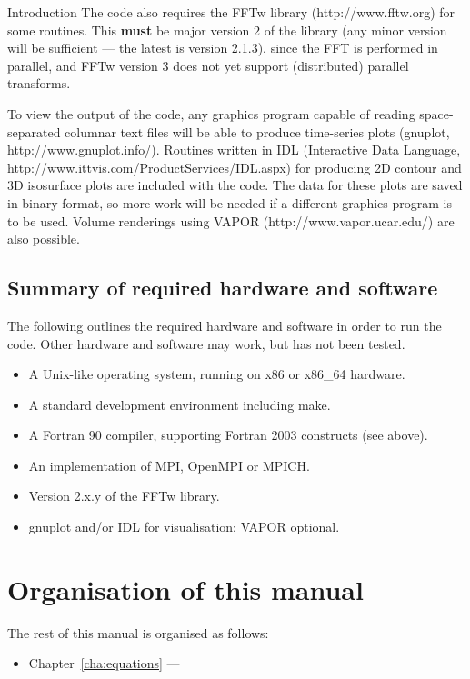 \begin{chapter}{\label{cha:introduction}Introduction}
  The code also requires the FFTw library (http://www.fftw.org) for some
  routines.  This \textbf{must} be major version 2 of the library (any minor
  version will be sufficient --- the latest is version 2.1.3), since the FFT is
  performed in parallel, and FFTw version 3 does not yet support (distributed)
  parallel transforms.

  To view the output of the code, any graphics program capable of reading
  space-separated columnar text files will be able to produce time-series plots
  (\eg gnuplot, http://www.gnuplot.info/).  Routines written in IDL
  (Interactive Data Language, http://www.ittvis.com/ProductServices/IDL.aspx)
  for producing 2D contour and 3D isosurface plots are included with the code.
  The data for these plots are saved in binary format, so more work will be
  needed if a different graphics program is to be used.  Volume renderings
  using VAPOR (http://www.vapor.ucar.edu/) are also possible.

  \subsection{Summary of required hardware and software}
  The following outlines the required hardware and software in order to run the
  code.  Other hardware and software may work, but has not been tested.
  \begin{itemize}
    \item A Unix-like operating system, running on x86 or x86\_64 hardware.
    \item A standard development environment including make.
    \item A Fortran 90 compiler, supporting Fortran 2003 constructs (see
      above).
    \item An implementation of MPI, \eg OpenMPI or MPICH.
    \item Version 2.x.y of the FFTw library.
    \item gnuplot and/or IDL for visualisation; VAPOR optional.
  \end{itemize}

  \section{Organisation of this manual}
  The rest of this manual is organised as follows:
  \begin{itemize}
    \item Chapter~\ref{cha:equations} ---
  \end{itemize}
\end{chapter}
